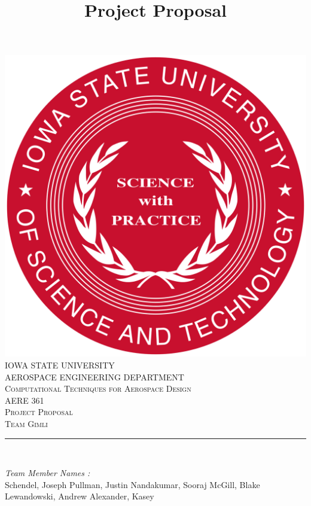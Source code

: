 \documentclass[12pt]{article}
\begin{document}
\title{Project Proposal}

\begin{titlepage}
	\centering
    \vspace*{0.5 cm}
    \includegraphics[scale = 0.11]{isu_seal.png}\\[1.0 cm]	%
    \textsc{\LARGE IOWA STATE UNIVERSITY}\\[2.0 cm]
    \textsc{\large AEROSPACE ENGINEERING DEPARTMENT}\\[0.2 cm]
    \textsc{\large Computational Techniques for Aerospace Design}\\[0.2 cm]
	\textsc{\Large AERE 361}\\[0.5 cm]				%
	\textsc{\Large Project Proposal}\\[0.2 cm]
	\textsc{\Large Team Gimli}\\[0.2 cm]
	\rule{\linewidth}{0.2 mm} \\[0.4 cm]
	
	
	\begin{minipage}{0.8\textwidth}
		
			\begin{flushleft} 
			\emph{Team Member Names :} \\
			Schendel, Joseph\linebreak
			Pullman, Justin\linebreak
			Nandakumar, Sooraj\linebreak
			McGill, Blake\linebreak
			Lewandowski, Andrew\linebreak
			Alexander, Kasey\linebreak
			

\end{flushleft}
\end{minipage}
\end{titlepage}
\end{document}
